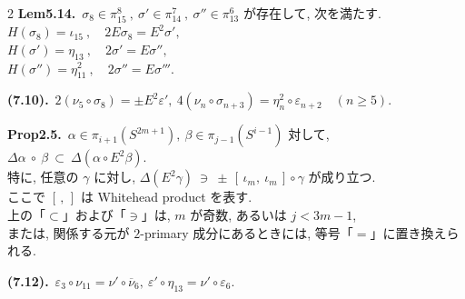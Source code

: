 \documentclass[10pt, leqno]{ltjsarticle}
\newcommand{\ov}[1]{\overline{#1}}
\numberwithin{equation}{section}
\theoremstyle{plain}
\theoremstyle{definition}
\theoremstyle{remark}
\begin{document}
\begin{paracol}{2}
\noindent
\textbf{Lem5.14.}\
\(\sigma_{8}\in\pi^{8}_{15}\ , \ \sigma'\in\pi^{7}_{14}\ , \ \sigma''\in\pi^{6}_{13}\) 
が存在して, 次を満たす. \\
\(H(\sigma_{8})=\iota_{15} \ ,\quad 2E\sigma_{8}=E^{2}\sigma',\)\\
\(H(\sigma')=\eta_{13} \ ,\quad 2\sigma'=E\sigma'',\)\\
\(H(\sigma'')=\eta_{11}^2 \ ,\quad 2\sigma''=E\sigma''' .\)

\noindent
\textbf{(7.10).}\
\(2(\nu_{5}\circ\sigma_{8})=\pm E^{2}\varepsilon',\
4(\nu_{n}\circ\sigma_{n+3})=\eta_{n}^{2}\circ\varepsilon_{n+2}\quad(n\ge5).\)

\noindent
\textbf{Prop2.5.}\
$\alpha\in\pi_{i+1}(S^{2m+1}), \ \beta\in \pi_{j-1}(S^{i-1})$ 対して, 
\(
\Delta\alpha\ \circ\ \beta\ \subset\ \Delta(\alpha\circ E^2\beta).
\)\\
特に, 任意の $\gamma$ に対し,
\(
\Delta(E^2\gamma)\ \ni\ \pm\,[\,\iota_m,\ \iota_m\,]\circ\gamma
\)
が成り立つ. \\
ここで $[\, ,\,]$ は Whitehead product を表す. \\
上の「$\subset$」および「$\ni$」は, $m$ が奇数, 
あるいは $j<3m-1$, \\
または, 関係する元が \(2\)-primary 成分にあるときには, 
等号「$=$」に置き換えられる. 

\noindent
\textbf{(7.12).}\
\(\varepsilon_3\circ\nu_{11} = \nu'\circ\ov{\nu}_6,\
\varepsilon'\circ\eta_{13} = \nu'\circ\varepsilon_6 .\)






\end{paracol}
\end{document}
